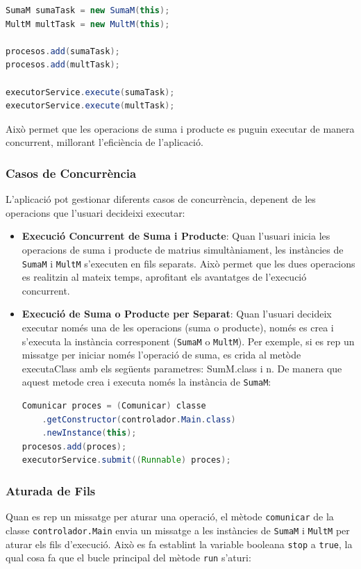 \documentclass{ieeetj}
\begin{document}
\begin{lstlisting}[language=Java, basicstyle=\ttfamily\normalsize]
SumaM sumaTask = new SumaM(this);
MultM multTask = new MultM(this);

procesos.add(sumaTask);
procesos.add(multTask);

executorService.execute(sumaTask);
executorService.execute(multTask);
\end{lstlisting}

Això permet que les operacions de suma i producte es puguin executar de manera concurrent, millorant l'eficiència de l'aplicació.

\subsubsection{Casos de Concurrència}
L'aplicació pot gestionar diferents casos de concurrència, depenent de les operacions que l'usuari decideixi executar:

\begin{itemize}
    \item \textbf{Execució Concurrent de Suma i Producte}: Quan l'usuari inicia les operacions de suma i producte de matrius simultàniament, les instàncies de \texttt{SumaM} i \texttt{MultM} s'executen en fils separats. Això permet que les dues operacions es realitzin al mateix temps, aprofitant els avantatges de l'execució concurrent.
    \item \textbf{Execució de Suma o Producte per Separat}: Quan l'usuari decideix executar només una de les operacions (suma o producte), només es crea i s'executa la instància corresponent (\texttt{SumaM} o \texttt{MultM}). Per exemple, si es rep un missatge per iniciar només l'operació de suma, es crida al metòde executaClass amb els següents parametres: SumM.class i n. De manera que aquest metode  crea i executa només la instància de \texttt{SumaM}:

\begin{lstlisting}[language=Java, basicstyle=\ttfamily\normalsize]
Comunicar proces = (Comunicar) classe
    .getConstructor(controlador.Main.class)
    .newInstance(this);
procesos.add(proces);
executorService.submit((Runnable) proces);
\end{lstlisting}

\end{itemize}

\subsubsection{Aturada de Fils}
Quan es rep un missatge per aturar una operació, el mètode \texttt{comunicar} de la classe \texttt{controlador.Main} envia un missatge a les instàncies de \texttt{SumaM} i \texttt{MultM} per aturar els fils d'execució. Això es fa establint la variable booleana \texttt{stop} a \texttt{true}, la qual cosa fa que el bucle principal del mètode \texttt{run} s'aturi:
\end{document}
